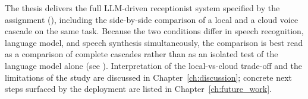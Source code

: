 The thesis delivers the full LLM-driven receptionist system specified by the assignment (), including the side-by-side comparison of a local and a cloud voice cascade on the same task. Because the two conditions differ in speech recognition, language model, and speech synthesis simultaneously, the comparison is best read as a comparison of complete cascades rather than as an isolated test of the language model alone (see ).
Interpretation of the local-vs-cloud trade-off and the limitations of the study are discussed in Chapter~\ref{ch:discussion}; concrete next steps surfaced by the deployment are listed in Chapter~\ref{ch:future_work}.
